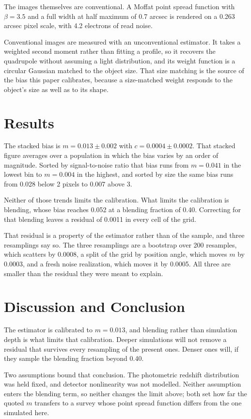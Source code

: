 \documentclass{article}
\newcommand{\mbias}{0.013}
\newcommand{\cbias}{0.0004}
\begin{document}
The images themselves are conventional. A Moffat point spread function with
$\beta = 3.5$ and a full width at half maximum of 0.7 arcsec is rendered on a
0.263 arcsec pixel scale, with 4.2 electrons of read noise.

Conventional images are measured with an unconventional estimator. It takes a
weighted second moment rather than fitting a profile, so it recovers the
quadrupole without assuming a light distribution, and its weight function is a
circular Gaussian matched to the object size. That size matching is the source
of the bias this paper calibrates, because a size-matched weight responds to
the object's size as well as to its shape.

\section{Results}

The stacked bias is $m = \mbias \pm 0.002$ with $c = \cbias \pm 0.0002$. That
stacked figure averages over a population in which the bias varies by an order
of magnitude. Sorted by signal-to-noise ratio that bias runs from $m = 0.041$ in
the lowest bin to $m = 0.004$ in the highest, and sorted by size the same bias
runs from 0.028 below 2 pixels to 0.007 above 3.

Neither of those trends limits the calibration. What limits the calibration is
blending, whose bias reaches 0.052 at a blending fraction of 0.40. Correcting
for that blending leaves a residual of 0.0011 in every cell of the grid.

That residual is a property of the estimator rather than of the sample, and
three resamplings say so. The three resamplings are a bootstrap over 200
resamples, which scatters by 0.0008, a split of the grid by position angle,
which moves $m$ by 0.0003, and a fresh noise realization, which moves it by
0.0005. All three are smaller than the residual they were meant to explain.

\section{Discussion and Conclusion}

The estimator is calibrated to $m = \mbias$, and blending rather than
simulation depth is what limits that calibration. Deeper simulations will not
remove a residual that survives every resampling of the present ones. Denser
ones will, if they sample the blending fraction beyond 0.40.

Two assumptions bound that conclusion. The photometric redshift distribution
was held fixed, and detector nonlinearity was not modelled. Neither assumption
enters the blending term, so neither changes the limit above; both set how far
the quoted $m$ transfers to a survey whose point spread function differs from
the one simulated here.
\end{document}
